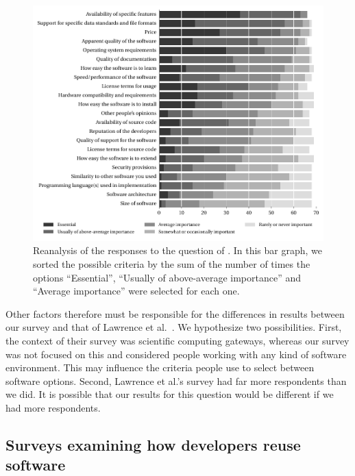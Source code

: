 \documentclass{casicswhitepaper}
\begin{document}
\begin{figure}[bht]
  \vspace*{-1ex}
  \centering
  \includegraphics[width=6.1in]{files/plots/bar-graph-criteria-ready-to-run-reranked.pdf}
  \vspace*{-2ex}
  \caption{Reanalysis of the responses to the question of \protect{}.  In this bar graph, we sorted the possible criteria by the sum of the number of times the options ``Essential'', ``Usually of above-average importance'' and ``Average importance'' were selected for each one.}
  \label{criteria-ready-to-run-reranked}
\end{figure}

Other factors therefore must be responsible for the differences in results between our survey and that of Lawrence et al.~\cite{lawrence2015science}.  We hypothesize two possibilities.  First, the context of their survey was scientific computing gateways, whereas our survey was not focused on this and considered people working with any kind of software environment.  This may influence the criteria people use to select between software options.  Second, Lawrence et al.'s survey had far more respondents than we did.  It is possible that our results for this question would be different if we had more respondents.


\subsection{Surveys examining how developers reuse software}
\end{document}
